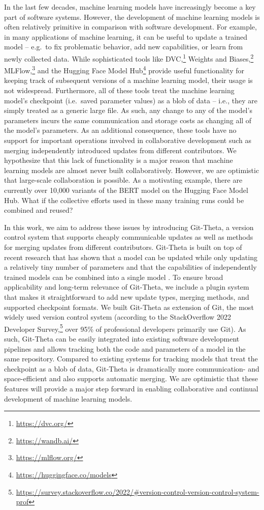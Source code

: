 \documentclass[nohyperref]{article}
\theoremstyle{plain}
\theoremstyle{definition}
\theoremstyle{remark}
\begin{document}
In the last few decades, machine learning models have increasingly become a key part of software systems.
However, the development of machine learning models is often relatively primitive in comparison with software development.
For example, in many applications of machine learning, it can be useful to update a trained model -- e.g.\ to fix problematic behavior, add new capabilities, or learn from newly collected data.
While sophisticated tools like DVC,\footnote{\url{https://dvc.org/}} Weights and Biases,\footnote{\url{https://wandb.ai/}} MLFlow,\footnote{\url{https://mlflow.org/}} and the Hugging Face Model Hub\footnote{\url{https://huggingface.co/models}} provide useful functionality for keeping track of subsequent versions of a machine learning model, their usage is not widespread.
Furthermore, all of these tools treat the machine learning model's checkpoint (i.e.\ saved parameter values) as a blob of data -- i.e., they are simply treated as a generic large file.
As such, any change to any of the model's parameters incurs the same communication and storage costs as changing all of the model's parameters.
As an additional consequence, these tools have no support for important operations involved in collaborative development such as merging independently introduced updates from different contributors.
We hypothesize that this lack of functionality is a major reason that machine learning models are almost never built collaboratively.
However, we are optimistic that large-scale collaboration is possible. 
As a motivating example, there are currently over 10,000 variants of the BERT model on the Hugging Face Model Hub.
What if the collective efforts used in these many training runs could be combined and reused?

In this work, we aim to address these issues by introducing Git-Theta, a version control system that supports cheaply communicable updates as well as methods for merging updates from different contributors.
Git-Theta is built on top of recent research that has shown that a model can be updated while only updating a relatively tiny number of parameters \citep{hu2021lora,sung2021sparse,guo2020diffpruning,liu2022tfew} and that the capabilities of independently trained models can be combined into a single model \citep{matena2021merging,todo}.
To ensure broad applicability and long-term relevance of Git-Theta, we include a plugin system that makes it straightforward to add new update types, merging methods, and supported checkpoint formats.
We built Git-Theta as extension of Git, the most widely used version control system (according to the StackOverflow 2022 Developer Survey,\footnote{\url{https://survey.stackoverflow.co/2022/\#version-control-version-control-system-prof}} over 95\% of professional developers primarily use Git).
As such, Git-Theta can be easily integrated into existing software development pipelines and allows tracking both the code and parameters of a model in the same repository.
Compared to existing systems for tracking models that treat the checkpoint as a blob of data, Git-Theta is dramatically more communication- and space-efficient and also supports automatic merging.
We are optimistic that these features will provide a major step forward in enabling collaborative and continual development of machine learning models.
\end{document}
